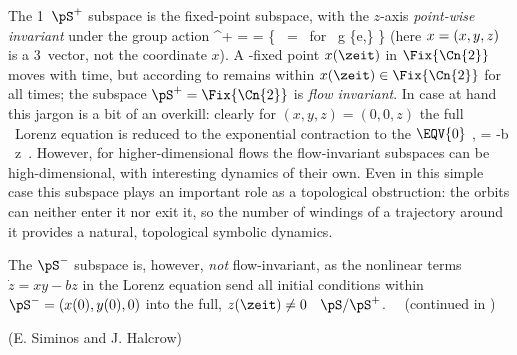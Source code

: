 {The 1\dmn\ $\pS^+$ subspace is the fixed-point subspace, with the
$z$-axis \emph{point-wise invariant} under the group action
\beq
\pS^+ =  =
   \{ \ssp \in \pS \mid \LieEl  \, \ssp = \ssp \mbox{ for } g \in \{e,\shift\} \}
(here $x = (x,y,z)$ is a 3\dmn\ vector, not the coordinate $x$). A
-fixed point $\ssp(\zeit)$ in $\Fix{\Cn{2}}$ moves with time, but
according to  remains within $\ssp(\zeit) \in \Fix{\Cn{2}}$ for
all times; the  subspace $\pS^+ = \Fix{\Cn{2}}$ is {\em flow invariant}.
In case at hand this jargon is a bit of an overkill: clearly for
$(x,y,z)=(0,0,z)$ the full \statesp\ Lorenz equation  is
reduced to the exponential contraction to the $\EQV{0}$ \eqv,
\beq
{} = -b \, z
\,.
However, for higher-dim\-ens\-ion\-al flows the flow-invariant subspaces
can be high-dim\-ens\-ion\-al, with interesting dynamics of their own.
Even in this simple case this subspace plays an important role as a
topological obstruction: the orbits can neither enter it nor exit it, so
the number of windings of a trajectory around it provides a natural,
topological symbolic dynamics.

The $\pS^-$ subspace is, however, {\em not} flow-invariant, as the nonlinear
terms $\dot{z}=xy - bz$ in the Lorenz equation 
send all initial conditions within
$\pS^-=(x(0),y(0),0)$ into the full, $z(\zeit) \neq 0$ \statesp\  $\pS/\pS^+$.
~~(continued in )

\hfill   (E. Siminos and J. Halcrow)
    } %
